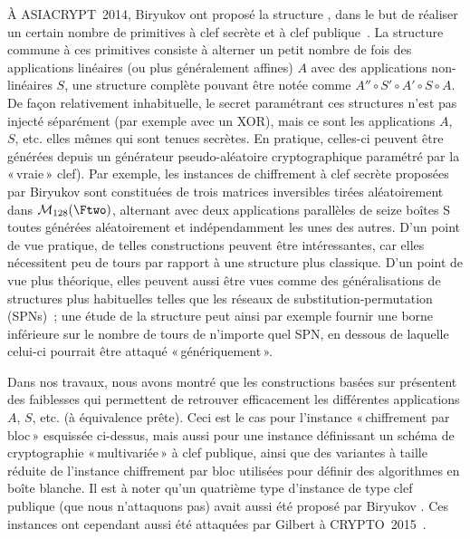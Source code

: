 À ASIACRYPT~2014, Biryukov \etal ont proposé la structure \asasa, dans le but de réaliser un certain nombre de primitives à clef secrète et à clef publique~\cite{DBLP:conf/asiacrypt/BiryukovBK14}.
La structure commune à ces primitives consiste à alterner un petit nombre de fois des applications linéaires (ou plus généralement affines) $A$ avec des applications non-linéaires $S$, une structure
complète pouvant être notée
comme $A'' \circ S' \circ A' \circ S \circ A$. De façon relativement inhabituelle, le secret paramétrant ces structures n'est pas injecté séparément (par exemple avec un XOR), mais ce sont
les applications $A$, $S$, etc. elles mêmes qui sont tenues secrètes.
En pratique, celles-ci peuvent être générées depuis un générateur pseudo-aléatoire cryptographique paramétré par la «\,vraie\,»
clef). Par exemple, les instances \asasa de chiffrement à clef secrète proposées par Biryukov \etal sont constituées de
trois matrices inversibles tirées aléatoirement dans $\mathcal{M}_{128}(\Ftwo)$,
alternant avec deux applications parallèles de seize boîtes S toutes générées aléatoirement et indépendamment les unes des autres.
D'un point de vue pratique, de telles constructions peuvent être intéressantes, car elles nécessitent peu de tours par rapport à une structure plus classique. D'un point de vue plus théorique, elles peuvent
aussi être vues comme des généralisations de structures plus habituelles telles que les réseaux de substitution-permutation (SPNs)~; une étude de la structure \asasa peut ainsi par exemple fournir une borne inférieure sur le nombre de tours
de n'importe quel SPN, en dessous de laquelle celui-ci pourrait être attaqué «\,génériquement\,».

Dans nos travaux, nous avons montré que les constructions basées sur \asasa présentent des faiblesses qui permettent de retrouver efficacement les différentes applications $A$, $S$, etc.
(à équivalence prête). Ceci est le cas pour l'instance «\,chiffrement par bloc\,» esquissée ci-dessus, mais aussi pour une instance définissant un schéma de cryptographie «\,multivariée\,»
à clef publique, ainsi que des variantes à taille réduite de l'instance chiffrement par bloc utilisées pour définir des algorithmes en boîte blanche.
Il est à noter qu'un quatrième type d'instance de type clef publique (que nous n'attaquons pas) avait aussi été proposé par Biryukov \etal. Ces instances ont cependant aussi été attaquées par
Gilbert \etal à CRYPTO~2015~\cite{DBLP:conf/crypto/GilbertPT15}.
 
